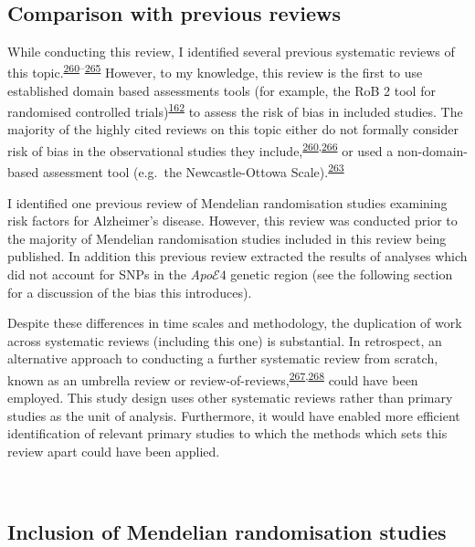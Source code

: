 \documentclass[a4paper, twoside]{templates/ociamthesis}
\begin{document}
~

\hypertarget{rev-previous-reviews}{%
\subsection{Comparison with previous reviews}\label{rev-previous-reviews}}

While conducting this review, I identified several previous systematic reviews of this topic.\textsuperscript{\protect\hyperlink{ref-chu2018}{260}--\protect\hyperlink{ref-kuzma2018risk}{265}} However, to my knowledge, this review is the first to use established domain based assessments tools (for example, the RoB 2 tool for randomised controlled trials)\textsuperscript{\protect\hyperlink{ref-sterne2019}{162}} to assess the risk of bias in included studies. The majority of the highly cited reviews on this topic either do not formally consider risk of bias in the observational studies they include,\textsuperscript{\protect\hyperlink{ref-chu2018}{260},\protect\hyperlink{ref-power2015}{266}} or used a non-domain-based assessment tool (e.g.~the Newcastle-Ottowa Scale).\textsuperscript{\protect\hyperlink{ref-poly2020}{263}}

I identified one previous review of Mendelian randomisation studies examining risk factors for Alzheimer's disease. However, this review was conducted prior to the majority of Mendelian randomisation studies included in this review being published. In addition this previous review extracted the results of analyses which did not account for SNPs in the \emph{Apo}\(\mathcal{E}4\) genetic region (see the following section for a discussion of the bias this introduces).

Despite these differences in time scales and methodology, the duplication of work across systematic reviews (including this one) is substantial. In retrospect, an alternative approach to conducting a further systematic review from scratch, known as an umbrella review or review-of-reviews,\textsuperscript{\protect\hyperlink{ref-aromataris2015}{267},\protect\hyperlink{ref-smith2011}{268}} could have been employed. This study design uses other systematic reviews rather than primary studies as the unit of analysis. Furthermore, it would have enabled more efficient identification of relevant primary studies to which the methods which sets this review apart could have been applied.

~

\hypertarget{rev-discussion-MR}{%
\subsection{Inclusion of Mendelian randomisation studies}\label{rev-discussion-MR}}
\end{document}
